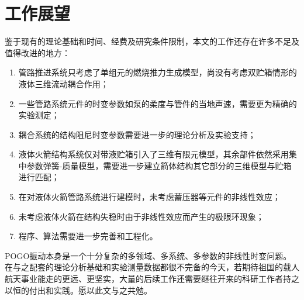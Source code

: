 \section{工作展望}
鉴于现有的理论基础和时间、经费及研究条件限制，本文的工作还存在许多不足及值得改进的地方：
\begin{enumerate}[leftmargin=0pt, align=parleft, itemindent=2\parindent, labelsep=0pt, label=\arabic*).]
	\item 管路推进系统只考虑了单组元的燃烧推力生成模型，尚没有考虑双贮箱情形的液体三维流动耦合作用；
	\item 一些管路系统元件的时变参数如泵的柔度与管件的当地声速，需要更为精确的实验测定；
	\item 耦合系统的结构阻尼时变参数需要进一步的理论分析及实验支持；
	\item 液体火箭结构系统仅对带液贮箱引入了三维有限元模型，其余部件依然采用集中参数弹簧-质量模型，需要进一步建立箭体结构其它部分的三维模型与贮箱进行匹配；
	\item 在对液体火箭管路系统进行建模时，未考虑蓄压器等元件的非线性效应；
	\item 未考虑液体火箭在结构失稳时由于非线性效应而产生的极限环现象；
	\item 程序、算法需要进一步完善和工程化。
\end{enumerate}

POGO振动本身是一个十分复杂的多领域、多系统、多参数的非线性时变问题。在与之配套的理论分析基础和实验测量数据都很不完备的今天，若期待祖国的载人航天事业能走的更远、更坚实，大量的后续工作还需要继往开来的科研工作者持之以恒的付出和实践。愿以此文与之共勉。

